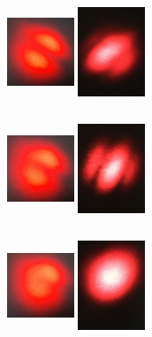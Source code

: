 \documentclass[12pt]{book}
\begin{document}
\begin{figure}[t!]
\begin{subfigure}[b]{0.3\linewidth}
\caption{}
\end{subfigure}
\begin{subfigure}[b]{0.3\linewidth}
\centering
\includegraphics[width=2cm,height=3cm]{images/fotos/91.jpg}
\includegraphics[width=2cm,height=3cm]{images/fotos/32.jpg}
\caption{}
\end{subfigure}
\begin{subfigure}[b]{0.3\linewidth}
\centering
\includegraphics[width=2cm,height=3cm]{images/fotos/101.jpg}
\includegraphics[width=2cm,height=3cm]{images/fotos/22.jpg}
\caption{}
\end{subfigure}
\begin{subfigure}[b]{0.3\linewidth}
\centering
\includegraphics[width=2cm,height=3cm]{images/fotos/111.jpg}
\includegraphics[width=2cm,height=3cm]{images/fotos/12.jpg}
\caption{}
\end{subfigure}


\end{figure}
\end{document}
